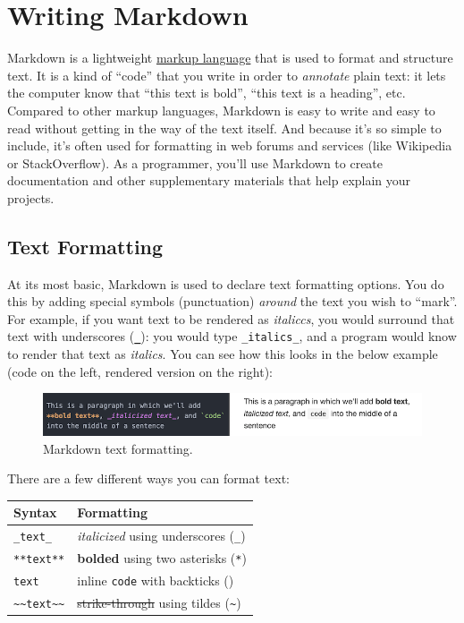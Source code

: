 \documentclass[]{book}
\theoremstyle{definition}
\theoremstyle{definition}
\theoremstyle{remark}
\begin{document}
\section{Writing Markdown}\label{writing-markdown}

Markdown is a lightweight
\href{https://en.wikipedia.org/wiki/Markup_language}{markup language}
that is used to format and structure text. It is a kind of ``code'' that
you write in order to \emph{annotate} plain text: it lets the computer
know that ``this text is bold'', ``this text is a heading'', etc.
Compared to other markup languages, Markdown is easy to write and easy
to read without getting in the way of the text itself. And because it's
so simple to include, it's often used for formatting in web forums and
services (like Wikipedia or StackOverflow). As a programmer, you'll use
Markdown to create documentation and other supplementary materials that
help explain your projects.

\subsection{Text Formatting}\label{text-formatting}

At its most basic, Markdown is used to declare text formatting options.
You do this by adding special symbols (punctuation) \emph{around} the
text you wish to ``mark''. For example, if you want text to be rendered
as \emph{italiccs}, you would surround that text with underscores
(\textbf{\texttt{\_}}): you would type \texttt{\_italics\_}, and a
program would know to render that text as \emph{italics}. You can see
how this looks in the below example (code on the left, rendered version
on the right):

\begin{figure}
\centering
\includegraphics{img/markdown/markdown-text.png}
\caption{Markdown text formatting.}
\end{figure}

There are a few different ways you can format text:

\begin{longtable}[]{@{}ll@{}}
\toprule
Syntax & Formatting\tabularnewline
\midrule
\endhead
\texttt{\_text\_} & \emph{italicized} using underscores
(\texttt{\_})\tabularnewline
\texttt{**text**} & \textbf{bolded} using two asterisks
(\texttt{*})\tabularnewline
\texttt{\textasciigrave{}text\textasciigrave{}} & inline \texttt{code}
with backticks (\texttt{\textasciigrave{}})\tabularnewline
\texttt{\textasciitilde{}\textasciitilde{}text\textasciitilde{}\textasciitilde{}}
& \sout{strike-through} using tildes
(\texttt{\textasciitilde{}})\tabularnewline
\bottomrule
\end{longtable}
\end{document}
